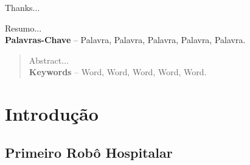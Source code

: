 \documentclass[]{politex}
\begin{document}
\capa
\falsafolhaderosto
\folhaderosto








\begin{agradecimentos}

Thanks...

\end{agradecimentos}




\begin{resumo}
Resumo...
%
\\[3\baselineskip]
%
\textbf{Palavras-Chave} -- Palavra, Palavra, Palavra, Palavra, Palavra.
\end{resumo}


\begin{abstract}
Abstract...
%
\\[3\baselineskip]
%
\textbf{Keywords} -- Word, Word, Word, Word, Word.
\end{abstract}


\listadefiguras
\listadetabelas

\sumario


\part{Introdução}
\chapter{Primeiro Robô Hospitalar}
\end{document}
